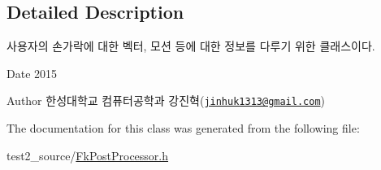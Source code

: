 \subsection{Detailed Description}
사용자의 손가락에 대한 벡터, 모션 등에 대한 정보를 다루기 위한 클래스이다. 

\begin{DoxyDate}{Date}
2015 
\end{DoxyDate}
\begin{DoxyAuthor}{Author}
한성대학교 컴퓨터공학과 강진혁(\href{mailto:jinhuk1313@gmail.com}{\tt jinhuk1313@gmail.\+com}) 
\end{DoxyAuthor}


The documentation for this class was generated from the following file\+:\begin{DoxyCompactItemize}
\item 
test2\+\_\+source/\hyperlink{_fk_post_processor_8h}{Fk\+Post\+Processor.\+h}\end{DoxyCompactItemize}
